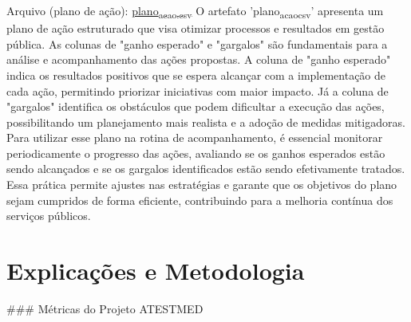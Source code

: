 \documentclass[11pt]{article}
\begin{document}
Arquivo (plano de ação): \href{file:///home/gustavodetarso/Documentos/atestmed-defender/graphs\_and\_tables/exports/relatorio\_fluxo\_b\_2025-01-01\_a\_2025-06-30\_plano\_acao.csv}{plano\textsubscript{acao.csv}}
O artefato 'plano\textsubscript{acao}\textsubscript{csv}' apresenta um plano de ação estruturado que visa otimizar processos e resultados em gestão pública. As colunas de "ganho esperado" e "gargalos" são fundamentais para a análise e acompanhamento das ações propostas. A coluna de "ganho esperado" indica os resultados positivos que se espera alcançar com a implementação de cada ação, permitindo priorizar iniciativas com maior impacto. Já a coluna de "gargalos" identifica os obstáculos que podem dificultar a execução das ações, possibilitando um planejamento mais realista e a adoção de medidas mitigadoras. Para utilizar esse plano na rotina de acompanhamento, é essencial monitorar periodicamente o progresso das ações, avaliando se os ganhos esperados estão sendo alcançados e se os gargalos identificados estão sendo efetivamente tratados. Essa prática permite ajustes nas estratégias e garante que os objetivos do plano sejam cumpridos de forma eficiente, contribuindo para a melhoria contínua dos serviços públicos.

\section{Explicações e Metodologia}
\label{sec:orgf9ac965}
\#\#\# Métricas do Projeto ATESTMED
\end{document}
